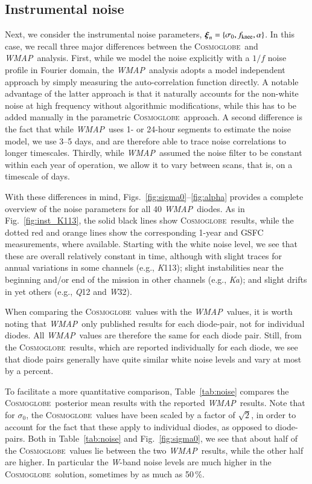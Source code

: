 \documentclass[twocolumn]{../../common/aa}
\def\WMAP{\emph{WMAP}}
\newcommand{\cosmoglobe}{\textsc{Cosmoglobe}}
\newcommand{\K}[0]{\textit K}
\newcommand{\Ka}[0]{\textit{Ka}}
\newcommand{\Q}[0]{\textit Q}
\newcommand{\W}[0]{\textit W}
\begin{document}
\subsection{Instrumental noise}
\label{sec:noise}

Next, we consider the instrumental noise parameters, $\boldsymbol\xi_n=\{\sigma_0, \fknee, \alpha\}$. In this case, we recall three major differences between the \cosmoglobe\ and \WMAP\ analysis. First, while we model the noise explicitly with a $1/f$ noise profile in Fourier domain, the \WMAP\ analysis adopts a model independent approach by simply measuring the auto-correlation function directly. A notable advantage of the latter approach is that it naturally accounts for the non-white noise at high frequency without algorithmic modifications, while this has to be added manually in the parametric \cosmoglobe\ approach. A second difference is the fact that while \WMAP\ uses 1- or 24-hour segments to estimate the noise model, we use 3--5 days, and are therefore able to trace noise correlations to longer timescales. Thirdly, while \WMAP\ assumed the noise filter to be constant within each year of operation, we allow it to vary between scans, that is, on a timescale of days.

With these differences in mind, Figs.~\ref{fig:sigma0}--\ref{fig:alpha} provides a complete overview of the noise parameters for all 40 \WMAP\ diodes. As in Fig.~\ref{fig:inst_K113}, the solid black lines show \cosmoglobe\ results, while the dotted red and orange lines show the corresponding 1-year and GSFC measurements, where available. Starting with the white noise level, we see that these are overall relatively constant in time, although with slight traces for annual variations in some channels (e.g., \K113); slight instabilities near the beginning and/or end of the mission in other channels (e.g., \Ka); and slight drifts in yet others (e.g., \Q12 and \W32).

When comparing the \cosmoglobe\ values with the \WMAP\ values, it is worth noting that \WMAP\ only published results for each diode-pair, not for individual diodes. All \WMAP\ values are therefore the same for each diode pair. Still, from the \cosmoglobe\ results, which are reported individually for each diode, we see that diode pairs generally have quite similar white noise levels and vary at most by a percent.

To facilitate a more quantitative comparison, Table~\ref{tab:noise} compares the \cosmoglobe\ posterior mean results with the reported \WMAP\ results. Note that for $\sigma_0$, the \cosmoglobe\ values have been scaled by a factor of $\sqrt{2}$, in order to account for the fact that these apply to individual diodes, as opposed to diode-pairs. Both in Table~\ref{tab:noise} and Fig.~\ref{fig:sigma0}, we see that about half of the \cosmoglobe\ values lie between the two \WMAP\ results, while the other half are higher. In particular the \W-band noise levels are much higher in the \cosmoglobe\ solution, sometimes by as much as 50\,\%.
\end{document}
